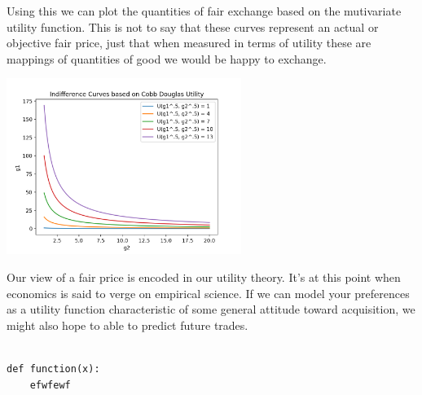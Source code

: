 \documentclass{tufte-handout}
\begin{document}
Using this we can plot the quantities of fair exchange based on the mutivariate utility function. This is not to say that these curves represent an actual or objective fair price, just that when measured in terms of utility these are mappings of quantities of good we would be happy to exchange.

\begin{marginfigure}
\includegraphics[width=3in, height=5.in]{Plots/indifference_curves.png}
\end{marginfigure}

Our view of a fair price is encoded in our utility theory. It's at this point when economics is said to verge on empirical science. If we can model your preferences as a utility function characteristic of some general attitude toward acquisition, we might also hope to able to predict future trades.  

\begin{verbatim}

def function(x):
	efwfewf

\end{verbatim}



\end{document}
